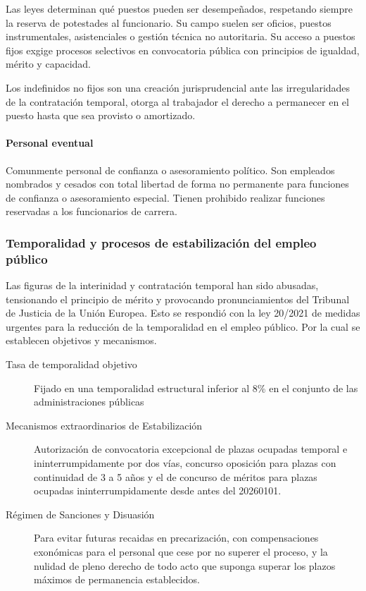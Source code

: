             Las leyes determinan qué puestos pueden ser desempeñados, respetando siempre la reserva de potestades al funcionario. Su campo suelen ser oficios, puestos instrumentales, asistenciales o gestión técnica no autoritaria. Su acceso a puestos fijos exgige procesos selectivos en convocatoria pública con principios de igualdad, mérito y capacidad.

            Los indefinidos no fijos son una creación jurisprudencial ante las irregularidades de la contratación temporal, otorga al trabajador el derecho a permanecer en el puesto hasta que sea provisto o amortizado.

        \paragraph{Personal eventual}
            Comunmente personal de confianza o asesoramiento político. Son empleados nombrados y cesados con total libertad de forma no permanente para funciones de confianza o asesoramiento especial. Tienen prohibido realizar funciones reservadas a los funcionarios de carrera.


    \subsubsection{Temporalidad y procesos de estabilización del empleo público} %
        Las figuras de la interinidad y contratación temporal han sido abusadas, tensionando el principio de mérito y provocando pronunciamientos del Tribunal de Justicia de la Unión Europea. Esto se respondió con la ley 20/2021 de medidas urgentes para la reducción de la temporalidad en el empleo público. Por la cual se establecen objetivos y mecanismos.
        \begin{description}
            \item[Tasa de temporalidad objetivo]Fijado en una temporalidad estructural inferior al 8\% en el conjunto de las administraciones públicas
            \item[Mecanismos extraordinarios de Estabilización] Autorización de convocatoria excepcional de plazas ocupadas temporal e ininterrumpidamente por dos vías, concurso oposición para plazas con continuidad de 3 a 5 años y el de concurso de méritos para plazas ocupadas ininterrumpidamente desde antes del 20260101.
            \item[Régimen de Sanciones y Disuasión] Para evitar futuras recaidas en precarización, con compensaciones exonómicas para el personal que cese por no superer el proceso, y la nulidad de pleno derecho de todo acto que suponga superar los plazos máximos de permanencia establecidos.
        \end{description}

